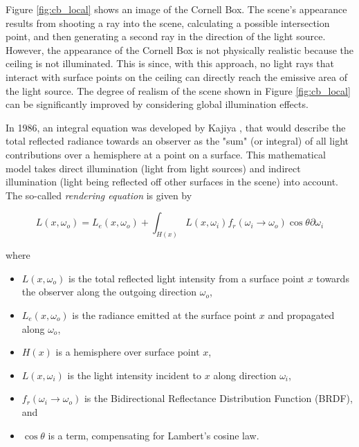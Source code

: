 Figure \ref{fig:cb_local} shows an image of the Cornell Box. The scene's appearance results from shooting a ray into the scene, calculating a possible intersection point, and then generating a second ray in the direction of the light source. However, the appearance of the Cornell Box is not physically realistic because the ceiling is not illuminated. This is since, with this approach, no light rays that interact with surface points on the ceiling can directly reach the emissive area of the light source. The degree of realism of the scene shown in Figure \ref{fig:cb_local} can be significantly improved by considering global illumination effects. 

In 1986, an integral equation was developed by Kajiya \cite{kajiya1986rendering}, that would describe the total reflected radiance towards an observer as the "sum" (or integral) of all light contributions over a hemisphere at a point on a surface. This mathematical model takes direct illumination (light from light sources) and indirect illumination (light being reflected off other surfaces in the scene) into account.
\\

The so-called \emph{rendering equation} is given by

\begin{equation}\label{eq:renderingeq}
L(x, \omega_{o}) = L_{e}(x, \omega_{o}) + \int_{H(x)} L(x, \omega_{i})f_{r}(\omega_{i} \rightarrow \omega_{o})\cos\theta\partial\omega_{i}
\end{equation}

\noindent where
\begin{itemize}
	\setlength\itemsep{0.05em}
	\item  $L(x, \omega_{o})$ is the total reflected light intensity from a surface point $x$ towards the observer along the outgoing direction $\omega_{o}$,
	\item  $L_{e}(x, \omega_{o})$ is the radiance emitted at the surface point $x$ and propagated along $\omega_{o}$,
	\item  $H(x)$ is a hemisphere over surface point $x$,
	\item 	$L(x, \omega_{i})$ is the light intensity incident to $x$ along direction $\omega_{i}$, 
	\item  $f_{r}(\omega_{i} \rightarrow \omega_{o})$ is the Bidirectional Reflectance Distribution Function (BRDF), and 
	\item  $\cos\theta$ is a term, compensating for Lambert's cosine law.
\end{itemize}

